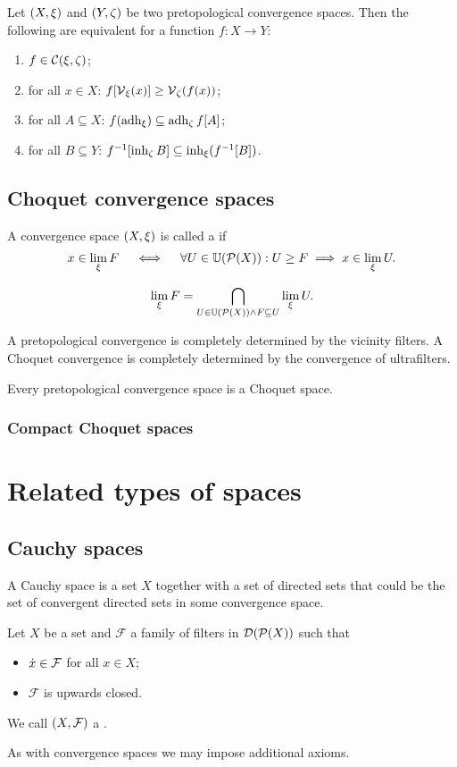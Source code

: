 \begin{proposition}
Let $\left( X,\xi \right)$ and $\left( Y,\zeta \right)$ be two pretopological convergence spaces. Then the following are equivalent for a function $f: X\to Y$:
\begin{enumerate}
\item $f\in \operatorname{\mathcal{C}}(\xi, \zeta)$;
\item for all $x\in X$: $f[\operatorname{\mathcal{V}}_\xi(x)] \geq \operatorname{\mathcal{V}}_\zeta(f(x))$;
\item for all $A\subseteq X$: $f(\operatorname{adh}_\xi) \subseteq \operatorname{adh}_\zeta f[A]$;
\item for all $B\subseteq Y$: $f^{-1}[\operatorname{inh}_\zeta B] \subseteq \operatorname{inh}_\xi(f^{-1}[B])$.
\end{enumerate}
\end{proposition}

\section{Choquet convergence spaces}
\begin{definition}
A convergence space $\left( X, \xi \right)$ is called a  if
\[ x\in \lim_\xi F \quad\iff\quad \forall U\in \operatorname{\mathbb{U}}(\operatorname{\mathcal{P}}(X)): U \geq F \implies x\in\lim_\xi U. \]
\end{definition}

\[ \lim_\xi F = \bigcap_{U\in \operatorname{\mathbb{U}}(\operatorname{\mathcal{P}}(X))\land F \subseteq U}\lim_\xi U. \]

A pretopological convergence is completely determined by the vicinity filters. A Choquet convergence is completely determined by the convergence of ultrafilters.

\begin{lemma}
Every pretopological convergence space is a Choquet space.
\end{lemma}

\subsection{Compact Choquet spaces}

\chapter{Related types of spaces}
\section{Cauchy spaces}
A Cauchy space is a set $X$ together with a set of directed sets that could be the set of convergent directed sets in some convergence space.
\begin{definition}
Let $X$ be a set and $\mathcal{F}$ a family of filters in $\operatorname{\mathcal{D}}(\operatorname{\mathcal{P}}(X))$ such that
\begin{itemize}
\item $\dot{x} \in \mathcal{F}$ for all $x\in X$;
\item $\mathcal{F}$ is upwards closed.
\end{itemize}
We call $\left( X, \mathcal{F} \right)$ a .
\end{definition}
As with convergence spaces we may impose additional axioms.

